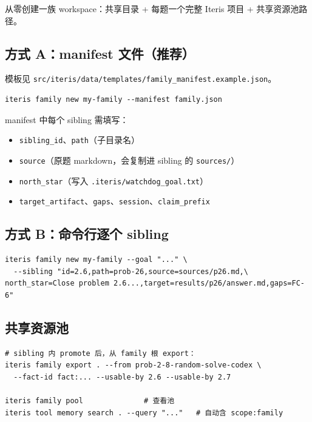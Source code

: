 \documentclass[11pt,a4paper]{ctexart}
\begin{document}
从零创建一族 workspace：共享目录 + 每题一个完整 Iteris 项目 + 共享资源池路径。

\subsection{方式 A：manifest 文件（推荐）}

模板见 \texttt{src/iteris/data/templates/family\_manifest.example.json}。

\begin{lstlisting}[style=shell]
iteris family new my-family --manifest family.json
\end{lstlisting}

manifest 中每个 sibling 需填写：
\begin{itemize}[nosep]
  \item \texttt{sibling\_id}、\texttt{path}（子目录名）
  \item \texttt{source}（原题 markdown，会复制进 sibling 的 \texttt{sources/}）
  \item \texttt{north\_star}（写入 \texttt{.iteris/watchdog\_goal.txt}）
  \item \texttt{target\_artifact}、\texttt{gaps}、\texttt{session}、\texttt{claim\_prefix}
\end{itemize}

\subsection{方式 B：命令行逐个 sibling}

\begin{lstlisting}[style=shell]
iteris family new my-family --goal "..." \
  --sibling "id=2.6,path=prob-26,source=sources/p26.md,\
north_star=Close problem 2.6...,target=results/p26/answer.md,gaps=FC-6"
\end{lstlisting}

\subsection{共享资源池}

\begin{lstlisting}[style=shell]
# sibling 内 promote 后，从 family 根 export：
iteris family export . --from prob-2-8-random-solve-codex \
  --fact-id fact:... --usable-by 2.6 --usable-by 2.7

iteris family pool              # 查看池
iteris tool memory search . --query "..."   # 自动含 scope:family
\end{lstlisting}
\end{document}

